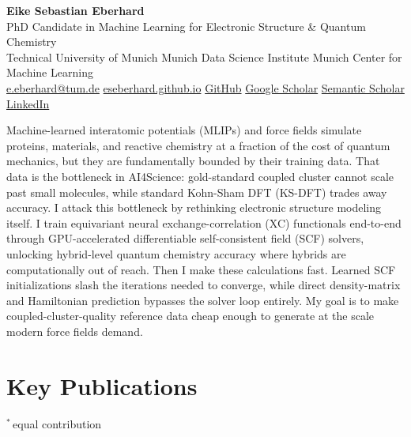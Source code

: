 \documentclass[10pt,a4paper]{article}
\newcommand{\sep}{\;{\color{rule}\textbar}\;}
\begin{document}
\begin{center}
  {\fontsize{26}{30}\selectfont\bfseries Eike Sebastian Eberhard}\\[0.45em]
  {\large\color{muted} PhD Candidate in Machine Learning for Electronic Structure \& Quantum Chemistry}\\[0.2em]
  {\color{muted} Technical University of Munich \textperiodcentered{} Munich Data Science Institute \textperiodcentered{} Munich Center for Machine Learning}\\[0.8em]
  {\small
  \href{mailto:e.eberhard@tum.de}{e.eberhard@tum.de}\sep
  \href{https://eseberhard.github.io}{eseberhard.github.io}\sep
  \href{https://github.com/ESEberhard}{GitHub}\sep
  \href{https://scholar.google.com/citations?user=FL38Be8AAAAJ}{Google Scholar}\sep
  \href{https://www.semanticscholar.org/author/Eike-Eberhard/2142552062}{Semantic Scholar}\sep
  \href{https://linkedin.com/in/eike-eberhard-23b170276}{LinkedIn}}
\end{center}
\vspace{0.25em}

{\small\setlength{\parskip}{0pt}\color{ink}
Machine-learned interatomic potentials (MLIPs) and force fields simulate proteins, materials, and reactive chemistry at a fraction of the cost of quantum mechanics, but they are fundamentally bounded by their training data.
That data is the bottleneck in AI4Science: gold-standard coupled cluster cannot scale past small molecules, while standard Kohn-Sham DFT (KS-DFT) trades away accuracy.
I attack this bottleneck by rethinking electronic structure modeling itself.
I train equivariant neural exchange-correlation (XC) functionals end-to-end through GPU-accelerated differentiable self-consistent field (SCF) solvers, unlocking hybrid-level quantum chemistry accuracy where hybrids are computationally out of reach.
Then I make these calculations fast.
Learned SCF initializations slash the iterations needed to converge, while direct density-matrix and Hamiltonian prediction bypasses the solver loop entirely.
My goal is to make coupled-cluster-quality reference data cheap enough to generate at the scale modern force fields demand.\par}

\section*{Key Publications}
{\footnotesize\color{muted}\hfill $^*$\,equal contribution\par}
\vspace{0.3em}
\end{document}
